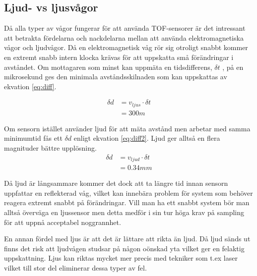 \documentclass[a4paper,12pt,fleqn]{article}
\begin{document}
\subsection{Ljud- vs ljusvågor}
Då alla typer av vågor fungerar för att använda TOF-sensorer är det intressant att betrakta fördelarna och nackdelarna mellan att använda elektromagnetiska vågor och ljudvågor.
Då en elektromagnetisk våg rör sig otroligt snabbt kommer en extremt snabb intern klocka krävas för att uppskatta små förändringar i avståndet. Om mottagaren som minst kan uppmäta en tidsdifferens, \begin{math}\delta t\end{math} , på en mikrosekund ges den minimala avståndsskilnaden som kan uppskattas av ekvation \ref{eq:diff}.

\begin{equation}
\label{eq:diff}
\begin{split}
\delta d & = v_{ljus}\cdot\delta t \\
& = 300 m
\end{split}
\end{equation}

Om sensorn istället använder ljud för att mäta avstånd men arbetar med samma minimumtid fås ett \begin{math}\delta d\end{math} enligt ekvation \ref{eq:diff2}.
Ljud ger alltså en flera magnituder bättre upplösning.
\begin{equation}
\label{eq:diff2}
\begin{split}
\delta d & = v_{ljud}\cdot\delta t \\
& = 0.34 mm
\end{split}
\end{equation}

Då ljud är långsammare kommer det dock att ta längre tid innan sensorn uppfattar en reflekterad våg, vilket kan innebära problem för system som behöver reagera extremt snabbt på förändringar. Vill man ha ett snabbt system bör man alltså överväga en ljussensor men detta medför i sin tur höga krav på sampling för att uppnå acceptabel noggrannhet.

En annan fördel med ljus är att det är lättare att rikta än ljud. Då ljud sänds ut finns det risk att ljudvågen studsar på någon oönskad yta vilket ger en felaktig uppskattning.
Ljus kan riktas mycket mer precis med tekniker som t.ex laser vilket till stor del eliminerar dessa typer av fel.
\end{document}
